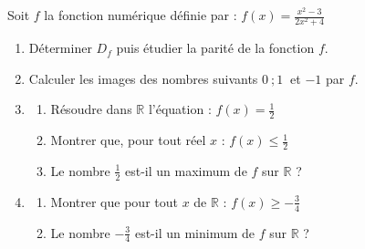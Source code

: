 \begin{Application}[][10 min]
Soit $f$ la fonction numérique définie par : \quad
$f(x) = \frac{x^2 - 3}{2x^2 + 4}$

\begin{enumerate}
  \item Déterminer $D_f$ puis étudier la parité de la fonction $f$.
  \item Calculer les images des nombres suivants $0 \ ; 1 \ $ et $ -1$ par $f$.
  \item
  \begin{enumerate}
    \item Résoudre dans $\mathbb{R}$ l'équation : $f(x) = \frac{1}{2}$
    \item Montrer que, pour tout réel $x$ : $f(x) \leqslant \frac{1}{2}$
    \item Le nombre $\frac{1}{2}$ est-il un maximum de $f$ sur $\mathbb{R}$ ?
  \end{enumerate}
  \item
  \begin{enumerate}
    \item Montrer que pour tout $x$ de $\mathbb{R}$ : $f(x) \geqslant -\frac{3}{4}$
    \item Le nombre $-\frac{3}{4}$ est-il un minimum de $f$ sur $\mathbb{R}$ ?
  \end{enumerate}
\end{enumerate}
\end{Application}
